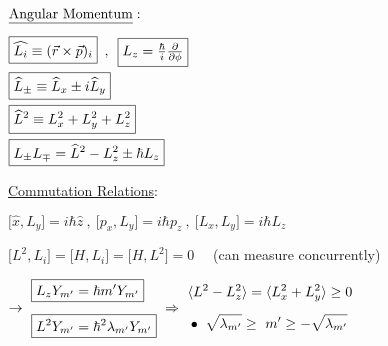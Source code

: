 \documentclass[12pt]{article}
\begin{document}
\noindent
\(
    \begin{aligned}[t]
        & \text{\underline{Angular Momentum}}:
            \\[5pt]
        & \boxed{ \widehat{L_i} \equiv ( \vec{r} \times \vec{p} )_i }
            \hspace{5pt}, \hspace{5pt} \boxed{ L_z = \tfrac{\hbar}{i} \tfrac{\partial}{\partial \phi}}
            \\
        & \boxed{ \widehat{L}_{\pm} \equiv \widehat{L}_x \pm i \widehat{L}_y } \\
        & \boxed{ \widehat{L}^2 \equiv L_x^2 + L_y^2 + L_z^2 } \\
        & \boxed{ L_\pm L_\mp = \widehat{L}^2 - L_z^2 \pm \hbar L_z  }
    \end{aligned}
\)
\hfill
\begin{minipage}[t]{.6\textwidth}
    \underline{Commutation Relations}:

    \vspace{10pt} \noindent \(
        \boxed{ \big[ \hat{x} , L_y \big] = i \hbar \hat{z} } 
        \ , \
        \boxed{ \big[ p_x , L_y \big] = i \hbar p_z }
        \ , \ 
        \boxed{ \big[ L_x , L_y \big] = i \hbar L_z } 
    \) %

    \vspace{10pt} \noindent \(
        \boxed{ \big[ L^2 , L_i \big] = \big[ H , L_i \big] = \big[ H , L^2 \big] = 0}
    \) \ \ {\scriptsize (can measure concurrently)}

    \vspace{10pt} \noindent \( 
        \rightarrow \ 
        \begin{aligned}
            \Aboxed{ L_z Y_{m'} & = \hbar m' Y_{m'} }\\[5pt]
            \Aboxed{ L^2 Y_{m'} & = \hbar^2 \lambda_{m'} Y_{m'} }
        \end{aligned}
        \ \Rightarrow \ 
        \begin{aligned}
            & \langle L^2 - L_z^2 \rangle 
                = \langle L_x^2 + L_y^2 \rangle 
                \geq 0
                \\[5pt]
            & \bullet \ \sqrt{\lambda_{m'}} 
                \geq \ m' \geq -\sqrt{\lambda_{m'}}
        \end{aligned} 
    \)
\end{minipage}
\end{document}
